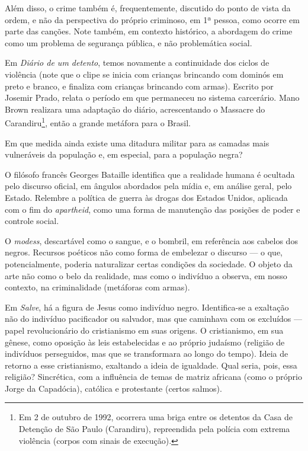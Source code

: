 Além disso, o crime também é, frequentemente, discutido do ponto de vista da ordem, e não da perspectiva do próprio criminoso, em 1ª pessoa, como ocorre em parte das canções. Note também, em contexto histórico, a abordagem do crime como um problema de segurança pública, e não problemática social.

Em \textit{Diário de um detento}, temos novamente a continuidade dos ciclos de violência (note que o clipe se inicia com crianças brincando com dominós em preto e branco, e finaliza com crianças brincando com armas). Escrito por Josemir Prado, relata o período em que permaneceu no sistema carcerário. Mano Brown realizara uma adaptação do diário, acrescentando o Massacre do Carandiru\footnote{Em 2 de outubro de 1992, ocorrera uma briga entre os detentos da Casa de Detenção de São Paulo (Carandiru), repreendida pela polícia com extrema violência (corpos com sinais de execução).}, então a grande metáfora para o Brasil.

Em que medida ainda existe uma ditadura militar para as camadas mais vulneráveis da população e, em especial, para a população negra?

O filósofo francês Georges Bataille identifica que a realidade humana é ocultada pelo discurso oficial, em ângulos abordados pela mídia e, em análise geral, pelo Estado. Relembre a política de guerra às drogas dos Estados Unidos, aplicada com o fim do \textit{apartheid}, como uma forma de manutenção das posições de poder e controle social.

O \textit{modess}, descartável como o sangue, e o bombril, em referência aos cabelos dos negros. Recursos poéticos não como forma de embelezar o discurso — o que, potencialmente, poderia naturalizar certas condições da sociedade. O objeto da arte não como o belo da realidade, mas como o indivíduo a observa, em nosso contexto, na criminalidade (metáforas com armas).

Em \textit{Salve}, há a figura de Jesus como indivíduo negro. Identifica-se a exaltação não do indivíduo pacificador ou salvador, mas que caminhava com os excluídos — papel revolucionário do cristianismo em suas origens. O cristianismo, em sua gênese, como oposição às leis estabelecidas e ao próprio judaísmo (religião de indivíduos perseguidos, mas que se transformara ao longo do tempo). Ideia de retorno a esse cristianismo, exaltando a ideia de igualdade. Qual seria, pois, essa religião? Sincrética, com a influência de temas de matriz africana (como o próprio Jorge da Capadócia), católica e protestante (certos salmos).

